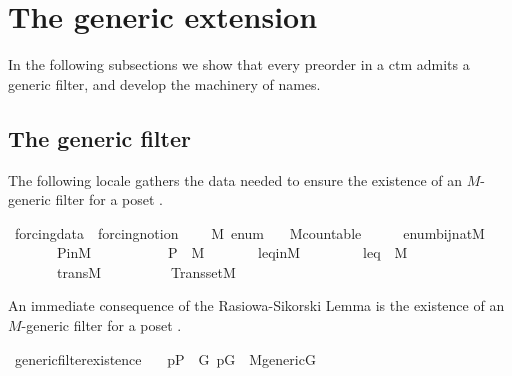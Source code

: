 \section{The generic extension}
In the following subsections we show that every preorder in a ctm
admits a generic filter, and develop the machinery of names.

\subsection{The generic filter}
\label{sec:generic-filter}
The following locale gathers the data needed to ensure the 
existence of an $M$-generic filter for a poset . 

\begin{isabelle}
\isamarkupfalse%
\ forcing{\isacharunderscore}data\ {\isacharequal}\ forcing{\isacharunderscore}notion\ {\isacharplus}\isanewline
\ \ \ M\ enum\isanewline
\ \ \ M{\isacharunderscore}countable{\isacharcolon}\ \ \ \ \ \ {\isachardoublequoteopen}enum{\isasymin}bij{\isacharparenleft}nat{\isacharcomma}M{\isacharparenright}{\isachardoublequoteclose}\isanewline
\ \ \ \ \ \ \ P{\isacharunderscore}in{\isacharunderscore}M{\isacharcolon}\ \ \ \ \ \ \ \ \ \ \ {\isachardoublequoteopen}P\ {\isasymin}\ M{\isachardoublequoteclose}\isanewline
\ \ \ \ \ \ \ leq{\isacharunderscore}in{\isacharunderscore}M{\isacharcolon}\ \ \ \ \ \ \ \ \ {\isachardoublequoteopen}leq\ {\isasymin}\ M{\isachardoublequoteclose}\isanewline
\ \ \ \ \ \ \ trans{\isacharunderscore}M{\isacharcolon}\ \ \ \ \ \ \ \ \ \ {\isachardoublequoteopen}Transset{\isacharparenleft}M{\isacharparenright}{\isachardoublequoteclose}
\end{isabelle}

An immediate consequence of the Rasiowa-Sikorski Lemma is the
existence of an $M$-generic filter for a poset .

\begin{isabelle}

\isamarkupfalse%
\ generic{\isacharunderscore}filter{\isacharunderscore}existence{\isacharcolon}\ \isanewline
\ \ {\isachardoublequoteopen}p{\isasymin}P\ {\isasymLongrightarrow}\ {\isasymexists}G{\isachardot}\ p{\isasymin}G\ {\isasymand}\ M{\isacharunderscore}generic{\isacharparenleft}G{\isacharparenright}{\isachardoublequoteclose}
\end{isabelle}

